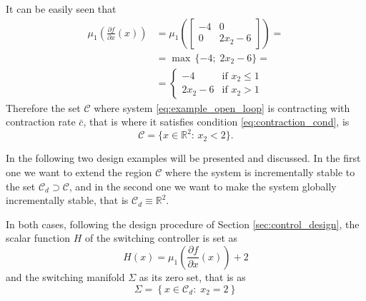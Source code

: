 \documentclass[letterpaper, 10 pt, conference]{ieeeconf}
\begin{document}
It can be easily seen that
\begin{equation*}
\begin{split}
\mu_1 \left(\frac{\partial f}{\partial x}(x)\right) &=
\mu_1\left( 
\begin{bmatrix}
-4 & 0\\
0 & 2x_2-6
\end{bmatrix} 
\right)=\\
&= \max\,\{ -4;\; 2x_2-6\}=\\
&=\begin{cases}
-4 & \mbox{if } x_2\leq 1\\
2x_2-6 & \mbox{if } x_2>1
\end{cases}
\end{split}
\end{equation*}
Therefore the set $\mathcal{C}$ where system \eqref{eq:example_open_loop} is contracting with contraction rate $\bar{c}$, that is where it satisfies condition \eqref{eq:contraction_cond}, is  
\begin{equation*}
\mathcal{C}=\{x\in\mathbb{R}^2:\, x_2<2\}.
\end{equation*}

In the following two design examples will be presented and discussed. In the first one we want to extend the region $\mathcal{C}$ where the system is incrementally stable to the set $\mathcal{C}_d\supset\mathcal{C}$, and in the second one we want to make the system globally incrementally stable, that is $\mathcal{C}_d\equiv\mathbb{R}^2$.

In both cases, following the design procedure of Section \ref{sec:control_design}, the scalar function $H$ of the switching controller is set as
\begin{equation*}
H(x)=\mu_1\left(\frac{\partial f}{\partial x}(x)\right)+2
\end{equation*}
and the switching manifold $\Sigma$ as its zero set, that is as
\begin{equation*}
\Sigma=\left\{ x\in\mathcal{C}_d:\; x_2=2 \right\}
\end{equation*}
\end{document}
